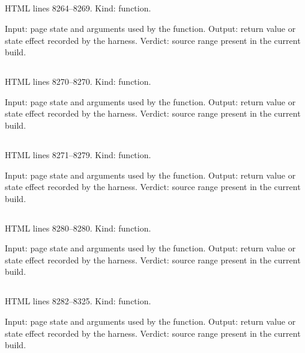 \subsection*{\texttt{}}
\label{vf_446_rdmlSampleType}
HTML lines 8264--8269. Kind: function.

Input: page state and arguments used by the function.
Output: return value or state effect recorded by the harness.
Verdict: source range present in the current build.

\subsection*{\texttt{}}
\label{vf_447_rdmlId}
HTML lines 8270--8270. Kind: function.

Input: page state and arguments used by the function.
Output: return value or state effect recorded by the harness.
Verdict: source range present in the current build.

\subsection*{\texttt{}}
\label{vf_448_analysisGroups}
HTML lines 8271--8279. Kind: function.

Input: page state and arguments used by the function.
Output: return value or state effect recorded by the harness.
Verdict: source range present in the current build.

\subsection*{\texttt{}}
\label{vf_449_curveAnalysisGroups}
HTML lines 8280--8280. Kind: function.

Input: page state and arguments used by the function.
Output: return value or state effect recorded by the harness.
Verdict: source range present in the current build.

\subsection*{\texttt{}}
\label{vf_450_makeRDMLXML}
HTML lines 8282--8325. Kind: function.

Input: page state and arguments used by the function.
Output: return value or state effect recorded by the harness.
Verdict: source range present in the current build.

